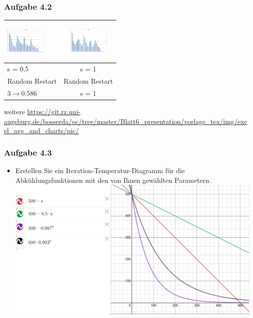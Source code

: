 \documentclass[xcolor=pdftex,dvipsnames,table]{beamer}
\begin{document}
\begin{frame}
  \frametitle{Aufgabe 4.2}
     \begin{tabular}{|l|c|} 
      \rowcolor[HTML]{CCD6CC}	
   \includegraphics[width=20mm, height=20mm]{img/excel_avg_and_charts/pic-neu/BB1_RandomRestartHillClimbing_s_0_5(neu).png}
 &  \includegraphics[width=20mm, height=20mm]{img/excel_avg_and_charts/pic-neu/BB1_RandomRestartHillClimbing_s_1(neu).png} \\ \hline
      \rowcolor[HTML]{A6BFB9} s = 0,5 & s = 1 \\ \hline
       \rowcolor[HTML]{A6BFB9} Random Restart &  Random Restart\\ \hline
       \rowcolor[HTML]{A6BFB9} $3 \rightarrow 0.586$ & s = 1 \\ \hline
    \end{tabular}
    \newline
    weitere
    \url{https://git.rz.uni-augsburg.de/bosserda/oc/tree/master/Blatt6_presentation/vorlage_tex/img/excel_avg_and_charts/pic/}
 \end{frame}

\begin{frame}
  \frametitle{Aufgabe 4.3}
  \begin{itemize}
  		\item Erstellen Sie ein Iteration-Temperatur-Diagramm für die Abkühlungsfunktionen mit den von
Ihnen gewählten Parametern.
\newline
\includegraphics[scale=0.3]{img/OC2_Blatt6_A4_3.png}
  \end{itemize}
\end{frame}
\end{document}
